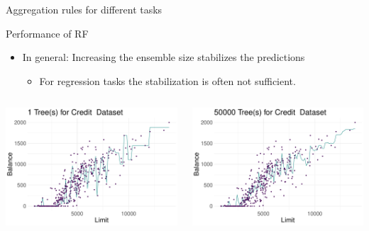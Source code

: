 \documentclass[11pt,compress,t,notes=noshow, xcolor=table]{beamer}
\begin{document}
\begin{vbframe}{Aggregation rules for different tasks}
\end{vbframe}


\begin{vbframe}{Performance of RF}
\begin{itemize}
\item \small In general: Increasing the ensemble size stabilizes the predictions
    \begin{itemize}
        \item \small For regression tasks the stabilization is often not sufficient. 
    \end{itemize}

\end{itemize}
\begin{columns}  
\begin{column}{0.5\textwidth} 
\begin{center}
 \includegraphics[width = 1\textwidth]{slides/forests/figure/nutshell_forest_ensemblesize_1.pdf}
 \end{center}
\end{column}
\begin{column}{0.5\textwidth} 
\begin{center}
  \includegraphics[width = 1\textwidth]{slides/forests/figure/nutshell_forest_ensemblesize_3.pdf}

\end{center}
\end{column}
\end{columns}
\end{vbframe}
\end{document}
